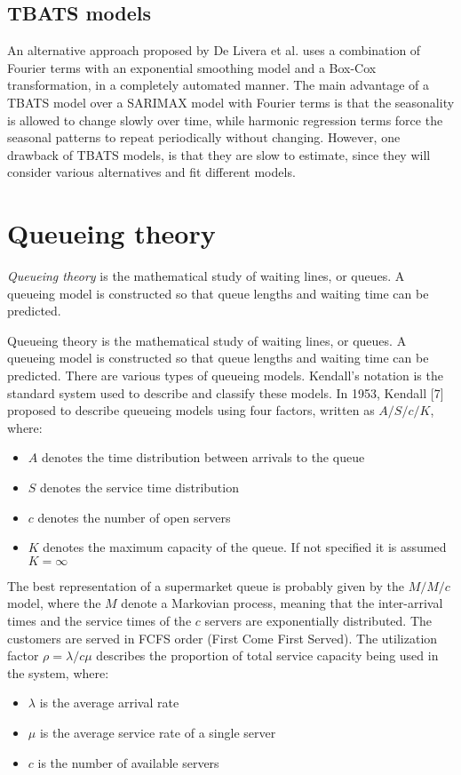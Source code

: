 \subsection{TBATS models}
\label{subsec:tbats_models}
An alternative approach proposed by De Livera et al. \cite{de_livera} uses a combination of Fourier terms with an exponential smoothing model and a Box-Cox transformation, in a completely automated manner. The main advantage of a TBATS model over a SARIMAX model with Fourier terms is that the seasonality is allowed to change slowly over time, while harmonic regression terms force the seasonal patterns to repeat periodically without changing. However, one drawback of TBATS models, is that they are slow to estimate, since they will consider various alternatives and fit different models.


\section{Queueing theory}
\label{sec:queueing_theory}

\emph{Queueing theory} is the mathematical study of waiting lines, or queues. A queueing model is constructed so that queue lengths and waiting time can be predicted.

Queueing theory is the mathematical study of waiting lines, or queues. A queueing model is constructed so that queue lengths and waiting time can be predicted. There are various types of queueing models. Kendall's notation is the standard system used to describe and classify these models. In 1953, Kendall [7] proposed to describe queueing models using four factors, written as $ A/S/c/K $, where:
\begin{itemize}
  \item $ A $ denotes the time distribution between arrivals to the queue
  \item $ S $ denotes the service time distribution
  \item $ c $ denotes the number of open servers
  \item $ K $ denotes the maximum capacity of the queue. If not specified it is assumed $ K = \infty $
\end{itemize}

The best representation of a supermarket queue is probably given by the $ M/M/c $ model, where the $ M $ denote a Markovian process, meaning that the inter-arrival times and the service times of the $ c $ servers are exponentially distributed. The customers are served in FCFS order (First Come First Served).
The utilization factor $ \rho = \lambda/c\mu $ describes the proportion of total service capacity being used in the system, where:
\begin{itemize}
  \item $ \lambda $ is the average arrival rate
  \item $ \mu $ is the average service rate of a single server
  \item $ c $ is the number of available servers
\end{itemize}

